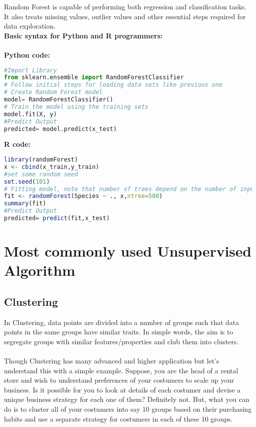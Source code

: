 \documentclass[Proceedings]{ascelike}
\begin{document}
Random Forest is capable of performing both regression and classification tasks. It also treats missing values, outlier values and other essential steps required for data exploration.\\
\textbf{Basic syntax for Python and R programmers:}\\
\\\textbf{Python code:}
\begin{lstlisting}[language=Python]
#Import Library
from sklearn.ensemble import RandomForestClassifier
# Follow initial steps for loading data sets like previous one
# Create Random Forest model
model= RandomForestClassifier()
# Train the model using the training sets 
model.fit(X, y)
#Predict Output
predicted= model.predict(x_test)
\end{lstlisting}
\textbf{R code:}
\begin{lstlisting}[language=R]
library(randomForest)
x <- cbind(x_train,y_train)
#set some random seed
set.seed(101)
# Fitting model, note that number of trees depend on the number of inputs and also size of data, here for instance assumed 500 trees
fit <- randomForest(Species ~ ., x,ntree=500)
summary(fit)
#Predict Output 
predicted= predict(fit,x_test)
\end{lstlisting}

\section{Most commonly used Unsupervised Algorithm}
\subsection{Clustering}

In Clustering, data points are divided into a number of groups such that data points in the same groups have similar traits. In simple words, the aim is to segregate groups with similar features/properties and club them into clusters.\\
\\Though Clustering has many advanced and higher application but let’s understand this with a simple example. Suppose, you are the head of a rental store and wish to understand preferences of your costumers to scale up your business. Is it possible for you to look at details of each costumer and devise a unique business strategy for each one of them? Definitely not. But, what you can do is to cluster all of your costumers into say 10 groups based on their purchasing habits and use a separate strategy for costumers in each of these 10 groups.\\
\end{document}
